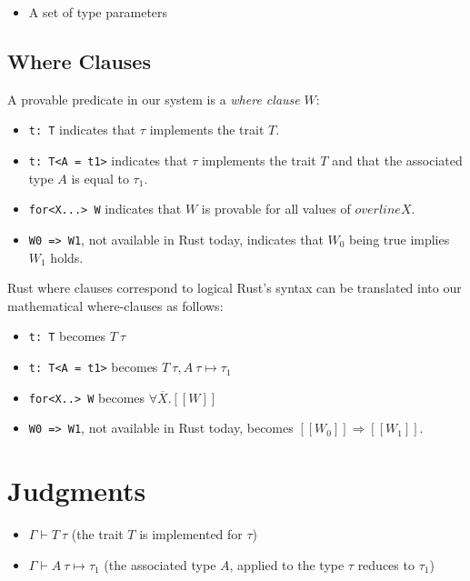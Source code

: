 \documentclass[sn-mathphys-num]{sn-jnl}%
\newcommand{\code}[1]{{\tt #1}}
\theoremstyle{thmstyleone}%
\theoremstyle{thmstyletwo}%
\theoremstyle{thmstylethree}%
\begin{document}
\begin{itemize}
    \item A set of type parameters 
\end{itemize}
    
\subsection{Where Clauses}

A provable predicate in our system is a \emph{where clause} $W$:

\begin{itemize}
    \item \code{t: T} indicates that $\tau$ implements the trait $T$.
    \item \code{t: T<A = t1>} indicates that $\tau$ implements the trait $T$ and that the associated type $A$ is equal to $\tau_1$.
    \item \code{for<X...> W} indicates that $W$ is provable for all values of $overline{X}$.
    \item \code{W0 => W1}, not available in Rust today, indicates that $W_0$ being true implies $W_1$ holds.
\end{itemize}


Rust where clauses correspond to logical
Rust's syntax can be translated into our mathematical where-clauses as follows:

\begin{itemize}
    \item \code{t: T} becomes $T\:\tau$
    \item \code{t: T<A = t1>} becomes $T\:\tau, A\:\tau \mapsto \tau_1$
    \item \code{for<X..> W} becomes $\forall\overline{X}. [\![ W ]\!]$
    \item \code{W0 => W1}, not available in Rust today, becomes $[\![ W_0 ]\!] \Rightarrow [\![ W_1 ]\!]$.
\end{itemize}

\section{Judgments}

\begin{itemize}
    \item $\Gamma \vdash T \: \tau$ (the trait $T$ is implemented for $\tau$)
    \item $\Gamma \vdash A \: \tau \mapsto \tau_1$ (the associated type $A$, applied to the type $\tau$ reduces to $\tau_1$)
\end{itemize}
\end{document}
